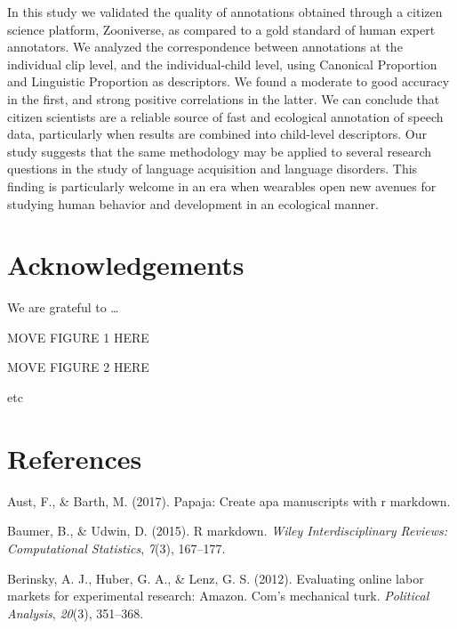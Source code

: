 \documentclass[english,,man,floatsintext]{apa6}
\begin{document}
In this study we validated the quality of annotations obtained through a citizen science platform, Zooniverse, as compared to a gold standard of human expert annotators. We analyzed the correspondence between annotations at the individual clip level, and the individual-child level, using Canonical Proportion and Linguistic Proportion as descriptors. We found a moderate to good accuracy in the first, and strong positive correlations in the latter. We can conclude that citizen scientists are a reliable source of fast and ecological annotation of speech data, particularly when results are combined into child-level descriptors. Our study suggests that the same methodology may be applied to several research questions in the study of language acquisition and language disorders. This finding is particularly welcome in an era when wearables open new avenues for studying human behavior and development in an ecological manner.

\newpage

\hypertarget{acknowledgements}{%
\section{Acknowledgements}\label{acknowledgements}}

We are grateful to \ldots{}

\newpage

MOVE FIGURE 1 HERE

\newpage

MOVE FIGURE 2 HERE

etc

\hypertarget{references}{%
\section{References}\label{references}}

\setlength{\parindent}{-0.5in}
\setlength{\leftskip}{0.5in}

\hypertarget{refs}{}
\leavevmode\hypertarget{ref-aust2017papaja}{}%
Aust, F., \& Barth, M. (2017). Papaja: Create apa manuscripts with r markdown.

\leavevmode\hypertarget{ref-baumer2015r}{}%
Baumer, B., \& Udwin, D. (2015). R markdown. \emph{Wiley Interdisciplinary Reviews: Computational Statistics}, \emph{7}(3), 167--177.

\leavevmode\hypertarget{ref-berinsky2012evaluating}{}%
Berinsky, A. J., Huber, G. A., \& Lenz, G. S. (2012). Evaluating online labor markets for experimental research: Amazon. Com's mechanical turk. \emph{Political Analysis}, \emph{20}(3), 351--368.
\end{document}
